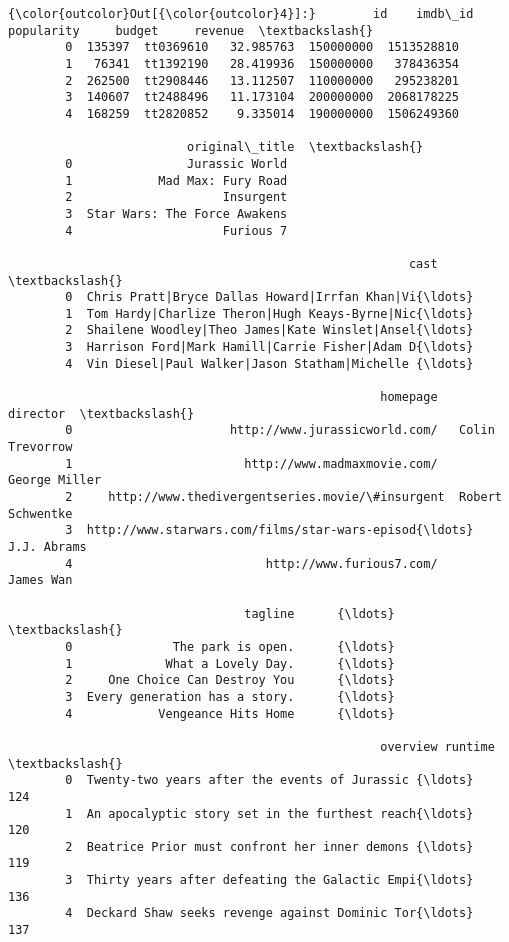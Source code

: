 \documentclass[11pt]{article}
\begin{document}
\begin{Verbatim}[commandchars=\\\{\}]
{\color{outcolor}Out[{\color{outcolor}4}]:}        id    imdb\_id  popularity     budget     revenue  \textbackslash{}
        0  135397  tt0369610   32.985763  150000000  1513528810   
        1   76341  tt1392190   28.419936  150000000   378436354   
        2  262500  tt2908446   13.112507  110000000   295238201   
        3  140607  tt2488496   11.173104  200000000  2068178225   
        4  168259  tt2820852    9.335014  190000000  1506249360   
        
                         original\_title  \textbackslash{}
        0                Jurassic World   
        1            Mad Max: Fury Road   
        2                     Insurgent   
        3  Star Wars: The Force Awakens   
        4                     Furious 7   
        
                                                        cast  \textbackslash{}
        0  Chris Pratt|Bryce Dallas Howard|Irrfan Khan|Vi{\ldots}   
        1  Tom Hardy|Charlize Theron|Hugh Keays-Byrne|Nic{\ldots}   
        2  Shailene Woodley|Theo James|Kate Winslet|Ansel{\ldots}   
        3  Harrison Ford|Mark Hamill|Carrie Fisher|Adam D{\ldots}   
        4  Vin Diesel|Paul Walker|Jason Statham|Michelle {\ldots}   
        
                                                    homepage          director  \textbackslash{}
        0                      http://www.jurassicworld.com/   Colin Trevorrow   
        1                        http://www.madmaxmovie.com/     George Miller   
        2     http://www.thedivergentseries.movie/\#insurgent  Robert Schwentke   
        3  http://www.starwars.com/films/star-wars-episod{\ldots}       J.J. Abrams   
        4                           http://www.furious7.com/         James Wan   
        
                                 tagline      {\ldots}       \textbackslash{}
        0              The park is open.      {\ldots}        
        1             What a Lovely Day.      {\ldots}        
        2     One Choice Can Destroy You      {\ldots}        
        3  Every generation has a story.      {\ldots}        
        4            Vengeance Hits Home      {\ldots}        
        
                                                    overview runtime  \textbackslash{}
        0  Twenty-two years after the events of Jurassic {\ldots}     124   
        1  An apocalyptic story set in the furthest reach{\ldots}     120   
        2  Beatrice Prior must confront her inner demons {\ldots}     119   
        3  Thirty years after defeating the Galactic Empi{\ldots}     136   
        4  Deckard Shaw seeks revenge against Dominic Tor{\ldots}     137   
        

\end{Verbatim}
\end{document}
